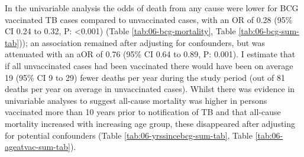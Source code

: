 \documentclass[11pt,twoside]{bristolthesis}
\begin{document}
  In the univariable analysis the odds of death from any cause were lower for BCG vaccinated TB cases compared to unvaccinated cases, with an OR of 0.28 (95\% CI 0.24 to 0.32, P: \textless{}0.001) (Table \ref{tab:06-bcg-mortality}, Table \ref{tab:06-bcg-sum-tab})); an association remained after adjusting for confounders, but was attenuated with an aOR of 0.76 (95\% CI 0.64 to 0.89, P: 0.001). I estimate that if all unvaccinated cases had been vaccinated there would have been on average 19 (95\% CI 9 to 29) fewer deaths per year during the study period (out of 81 deaths per year on average in unvaccinated cases). Whilst there was evidence in univariable analyses to suggest all-cause mortality was higher in persons vaccinated more than 10 years prior to notification of TB and that all-cause mortality increased with increasing age group, these disappeared after adjusting for potential confounders (Table \ref{tab:06-yrssincebcg-sum-tab}, Table \ref{tab:06-ageatvac-sum-tab}).
  
\end{document}
